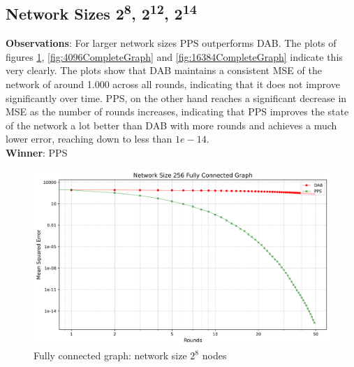 \subsection{Network Sizes 2\textsuperscript{8}, 2\textsuperscript{12}, 2\textsuperscript{14}}
\textbf{Observations}: For larger network sizes PPS outperforms DAB. The plots of figures \ref{fig:256CompleteGraph}, \ref{fig:4096CompleteGraph} and \ref{fig:16384CompleteGraph} indicate this very clearly. The plots show that DAB maintains a consistent MSE of the network of around 1.000 across all rounds, indicating that it does not improve significantly over time. PPS, on the other hand reaches a significant decrease in MSE as the number of rounds increases, indicating that PPS improves the state of the network a lot better than DAB with more rounds and achieves a much lower error, reaching down to less than $1e-14$.\\
\textbf{Winner}: PPS
\begin{figure}[H]
    \centering
    \includegraphics[scale=0.5]{figures/completeGraphSimulations/DAB_vs_PPS_FCG_r50_n256.png}
    \caption{Fully connected graph: network size $2^{8}$ nodes}
    \label{fig:256CompleteGraph}
\end{figure}

